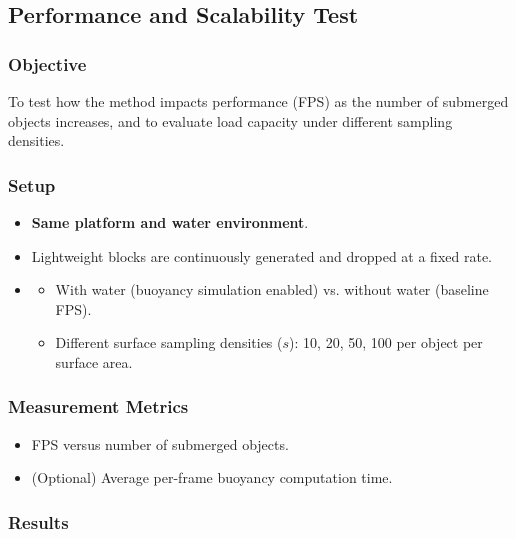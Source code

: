\subsection*{Performance and Scalability Test}

\subsubsection*{Objective}
To test how the method impacts performance (FPS) as the number of submerged objects increases, and to evaluate load capacity under different sampling densities.

\subsubsection*{Setup}
\begin{itemize}
		\item \textbf{Same platform and water environment}.
		\item {} Lightweight blocks are continuously generated and dropped at a fixed rate.
		\item {}
		\begin{itemize}
				\item With water (buoyancy simulation enabled) vs. without water (baseline FPS).
				\item Different surface sampling densities ($s$): 10, 20, 50, 100 per object per surface area.
		\end{itemize}
\end{itemize}

\subsubsection*{Measurement Metrics}
\begin{itemize}
		\item FPS versus number of submerged objects.
		\item (Optional) Average per-frame buoyancy computation time.
\end{itemize}

\subsubsection*{Results}

